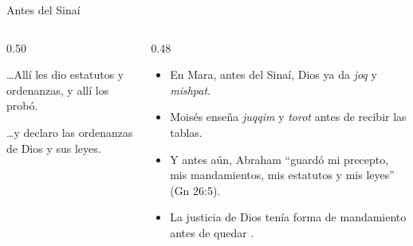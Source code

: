 \begin{frame}{Antes del Sinaí}
\begin{columns}[c,onlytextwidth]
\begin{column}{0.50\textwidth}
\begin{cita}\ldots{}Allí les dio estatutos y ordenanzas, y allí los probó.\end{cita}
\begin{center}\end{center}
\begin{cita}\ldots{}y declaro las ordenanzas de Dios y sus leyes.\end{cita}
\end{column}
\begin{column}{0.48\textwidth}\small
\begin{itemize}
\item En Mara, antes del Sinaí, Dios ya da \emph{joq} y \emph{mishpat}.
\item Moisés enseña \emph{juqqim} y \emph{torot} antes de recibir las tablas.
\item Y antes aún, Abraham ``guardó mi precepto, mis mandamientos, mis estatutos y mis leyes'' (Gn 26:5).
\item La justicia de Dios tenía forma de mandamiento antes de quedar .
\end{itemize}
\end{column}
\end{columns}
\end{frame}

